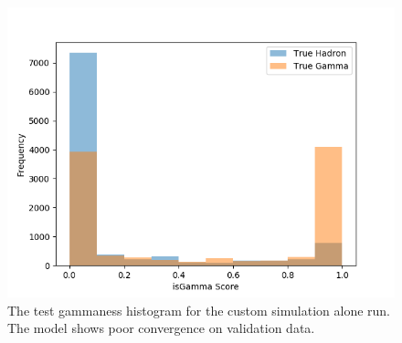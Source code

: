 \begin{figure}[ht] 
        \centering \includegraphics[width=\columnwidth]{figures/crabrun2_hist.png}

        \caption{
                \label{fig:cr2_hist} The test gammaness histogram for the custom simulation alone run. The model shows poor convergence on validation data.
        }
\end{figure}

